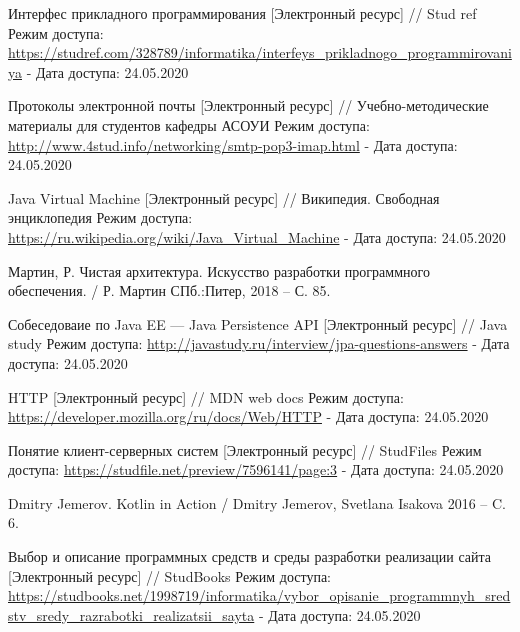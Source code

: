 \begingroup
\begin{thebibliography}{00}


    Интерфес прикладного программирования
    [Электронный ресурс] //
    Stud ref
    Режим доступа: \url{https://studref.com/328789/informatika/interfeys_prikladnogo_programmirovaniya} -
    Дата доступа: 24.05.2020
    
    Протоколы электронной почты
    [Электронный ресурс] //
    Учебно-методические материалы для студентов кафедры АСОУИ
    Режим доступа: \url{http://www.4stud.info/networking/smtp-pop3-imap.html} -
    Дата доступа: 24.05.2020
    
    Java Virtual Machine
    [Электронный ресурс] //
    Википедия. Свободная энциклопедия
    Режим доступа: \url{https://ru.wikipedia.org/wiki/Java_Virtual_Machine} -
    Дата доступа: 24.05.2020

    Мартин, Р.
    Чистая архитектура. Искусство разработки программного обеспечения. /
    Р. Мартин 
    СПб.:Питер, 2018 -- С. 85.

    Собеседоваие по Java EE --- Java Persistence API
    [Электронный ресурс] //
    Java study
    Режим доступа: \url{http://javastudy.ru/interview/jpa-questions-answers} -
    Дата доступа: 24.05.2020

    HTTP
    [Электронный ресурс] //
    MDN web docs
    Режим доступа: \url{https://developer.mozilla.org/ru/docs/Web/HTTP} -
    Дата доступа: 24.05.2020

    Понятие клиент-серверных систем
    [Электронный ресурс] //
    StudFiles
    Режим доступа: \url{https://studfile.net/preview/7596141/page:3} -
    Дата доступа: 24.05.2020

    Dmitry Jemerov.
    Kotlin in Action /
    Dmitry Jemerov, Svetlana Isakova
    2016 -- C. 6.

    Выбор и описание программных средств и среды разработки реализации сайта
    [Электронный ресурс] //
    StudBooks
    Режим доступа: \url{https://studbooks.net/1998719/informatika/vybor_opisanie_programmnyh_sredstv_sredy_razrabotki_realizatsii_sayta} -
    Дата доступа: 24.05.2020


\end{thebibliography}
